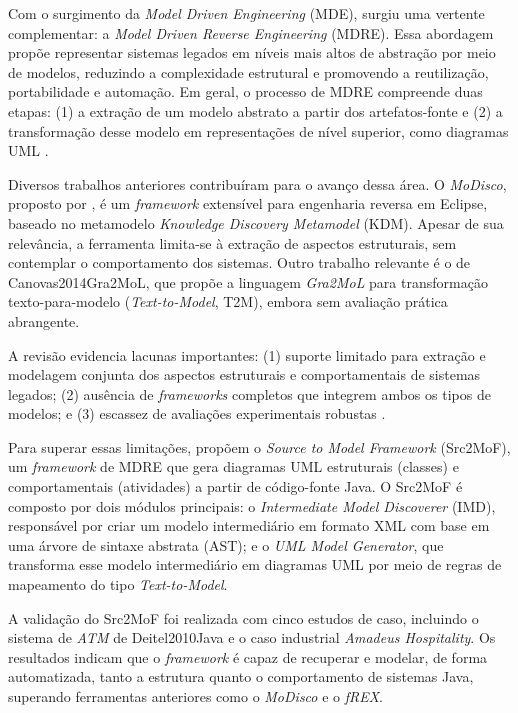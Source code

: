 \documentclass[12pt,a4paper]{article}
\begin{document}
Com o surgimento da \textit{Model Driven Engineering} (MDE), surgiu uma vertente complementar: a \textit{Model Driven Reverse Engineering} (MDRE). Essa abordagem propõe representar sistemas legados em níveis mais altos de abstração por meio de modelos, reduzindo a complexidade estrutural e promovendo a reutilização, portabilidade e automação. Em geral, o processo de MDRE compreende duas etapas: (1) a extração de um modelo abstrato a partir dos artefatos-fonte e (2) a transformação desse modelo em representações de nível superior, como diagramas UML \textcite{Sabir2019MDRE}.

Diversos trabalhos anteriores contribuíram para o avanço dessa área. O \textit{MoDisco}, proposto por \textcite{Bruneliere2010MoDisco}, é um \textit{framework} extensível para engenharia reversa em Eclipse, baseado no metamodelo \textit{Knowledge Discovery Metamodel} (KDM). Apesar de sua relevância, a ferramenta limita-se à extração de aspectos estruturais, sem contemplar o comportamento dos sistemas. Outro trabalho relevante é o de Canovas2014Gra2MoL, que propõe a linguagem \textit{Gra2MoL} para transformação texto-para-modelo (\textit{Text-to-Model}, T2M), embora sem avaliação prática abrangente.  

A revisão evidencia lacunas importantes: (1) suporte limitado para extração e modelagem conjunta dos aspectos estruturais e comportamentais de sistemas legados; (2) ausência de \textit{frameworks} completos que integrem ambos os tipos de modelos; e (3) escassez de avaliações experimentais robustas \textcite{Sabir2019MDRE}.

Para superar essas limitações, \textcite{Sabir2019MDRE} propõem o \textit{Source to Model Framework} (Src2MoF), um \textit{framework} de MDRE que gera diagramas UML estruturais (classes) e comportamentais (atividades) a partir de código-fonte Java. O Src2MoF é composto por dois módulos principais: o \textit{Intermediate Model Discoverer} (IMD), responsável por criar um modelo intermediário em formato XML com base em uma árvore de sintaxe abstrata (AST); e o \textit{UML Model Generator}, que transforma esse modelo intermediário em diagramas UML por meio de regras de mapeamento do tipo \textit{Text-to-Model}.

A validação do Src2MoF foi realizada com cinco estudos de caso, incluindo o sistema de \textit{ATM} de Deitel2010Java e o caso industrial \textit{Amadeus Hospitality}. Os resultados indicam que o \textit{framework} é capaz de recuperar e modelar, de forma automatizada, tanto a estrutura quanto o comportamento de sistemas Java, superando ferramentas anteriores como o \textit{MoDisco} e o \textit{fREX}.
\end{document}
